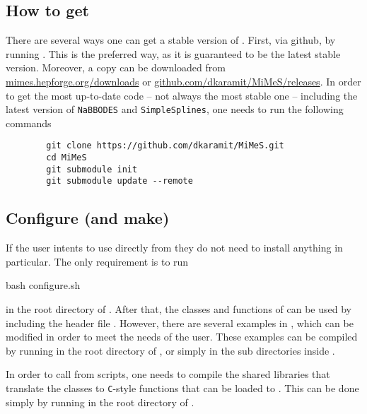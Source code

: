 \documentclass[a4paper,11pt]{article}
\begin{document}
	\subsection{How to get \mimes}
	There are several ways one can get a stable version of \mimes. First, via github, by running .
	This is the preferred way, as it is guaranteed to be the latest stable version. Moreover, a copy can be downloaded from 
	\href{https://mimes.hepforge.org/downloads}{mimes.hepforge.org/downloads} or \href{https://github.com/dkaramit/MiMeS/releases}{github.com/dkaramit/MiMeS/releases}.
	In order to get the most up-to-date code -- not always the most stable one -- including the latest version of {\tt NaBBODES} and {\tt SimpleSplines}, one needs to run
	the following commands
	\begin{lstlisting}
		git clone https://github.com/dkaramit/MiMeS.git
		cd MiMeS
		git submodule init
		git submodule update --remote
	\end{lstlisting}


	\subsection{Configure (and make)}
	If the user intents to use \mimes directly from \CPP they do not need to install anything in particular. The only requirement is to run 
	\begin{bash}
		bash configure.sh
	\end{bash}
	in the root directory of \mimes. After that, the classes and functions of \mimes can be used by including the header file .
	However, there are several examples in , which can be modified in order to meet the needs of the user. These examples can be 
	compiled by running   in the root directory of \mimes, or simply  in the sub directories inside .
	
	In order to call \mimes  from \PY scripts, one needs to compile the shared libraries that translate the \CPP classes to {\tt C}-style functions that can be loaded to 
	\PY. This can be done simply by running  in the root directory of \mimes.
	
	
\end{document}
